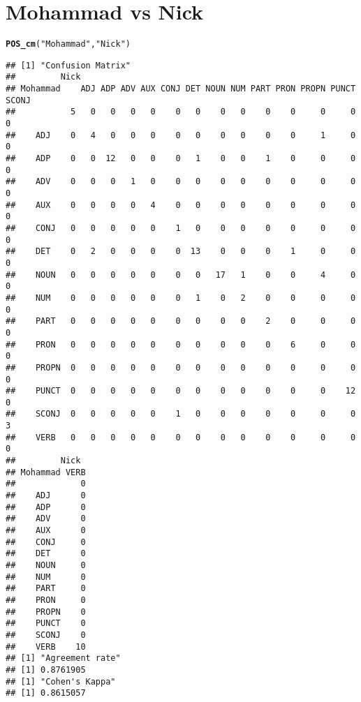 \documentclass{article}\usepackage[]{graphicx}\usepackage[]{color}
\makeatletter
\newcommand{\hlstr}[1]{\textcolor[rgb]{0.192,0.494,0.8}{#1}}%
\newcommand{\hlstd}[1]{\textcolor[rgb]{0.345,0.345,0.345}{#1}}%
\newcommand{\hlkwd}[1]{\textcolor[rgb]{0.737,0.353,0.396}{\textbf{#1}}}%
\newenvironment{kframe}{%
 \def\at@end@of@kframe{}%
 \ifinner\ifhmode%
  \def\at@end@of@kframe{\end{minipage}}%
  \begin{minipage}{\columnwidth}%
 \fi\fi%
 \def\FrameCommand##1{\hskip\@totalleftmargin \hskip-\fboxsep
 \colorbox{shadecolor}{##1}\hskip-\fboxsep
     \hskip-\linewidth \hskip-\@totalleftmargin \hskip\columnwidth}%
 \MakeFramed {\advance\hsize-\width
   \@totalleftmargin\z@ \linewidth\hsize
   \@setminipage}}%
 {\par\unskip\endMakeFramed%
 \at@end@of@kframe}
\newenvironment{knitrout}{}{} %
\makeatother
\begin{document}
\section*{Mohammad vs Nick}
\begin{knitrout}
\color{fgcolor}\begin{kframe}
\begin{alltt}
\hlkwd{POS_cm}\hlstd{(}\hlstr{"Mohammad"}\hlstd{,}\hlstr{"Nick"}\hlstd{)}
\end{alltt}
\begin{verbatim}
## [1] "Confusion Matrix"
##         Nick
## Mohammad    ADJ ADP ADV AUX CONJ DET NOUN NUM PART PRON PROPN PUNCT SCONJ
##           5   0   0   0   0    0   0    0   0    0    0     0     0     0
##    ADJ    0   4   0   0   0    0   0    0   0    0    0     1     0     0
##    ADP    0   0  12   0   0    0   1    0   0    1    0     0     0     0
##    ADV    0   0   0   1   0    0   0    0   0    0    0     0     0     0
##    AUX    0   0   0   0   4    0   0    0   0    0    0     0     0     0
##    CONJ   0   0   0   0   0    1   0    0   0    0    0     0     0     0
##    DET    0   2   0   0   0    0  13    0   0    0    1     0     0     0
##    NOUN   0   0   0   0   0    0   0   17   1    0    0     4     0     0
##    NUM    0   0   0   0   0    0   1    0   2    0    0     0     0     0
##    PART   0   0   0   0   0    0   0    0   0    2    0     0     0     0
##    PRON   0   0   0   0   0    0   0    0   0    0    6     0     0     0
##    PROPN  0   0   0   0   0    0   0    0   0    0    0     0     0     0
##    PUNCT  0   0   0   0   0    0   0    0   0    0    0     0    12     0
##    SCONJ  0   0   0   0   0    1   0    0   0    0    0     0     0     3
##    VERB   0   0   0   0   0    0   0    0   0    0    0     0     0     0
##         Nick
## Mohammad VERB
##             0
##    ADJ      0
##    ADP      0
##    ADV      0
##    AUX      0
##    CONJ     0
##    DET      0
##    NOUN     0
##    NUM      0
##    PART     0
##    PRON     0
##    PROPN    0
##    PUNCT    0
##    SCONJ    0
##    VERB    10
## [1] "Agreement rate"
## [1] 0.8761905
## [1] "Cohen's Kappa"
## [1] 0.8615057
\end{verbatim}
\end{kframe}
\end{knitrout}
\end{document}
